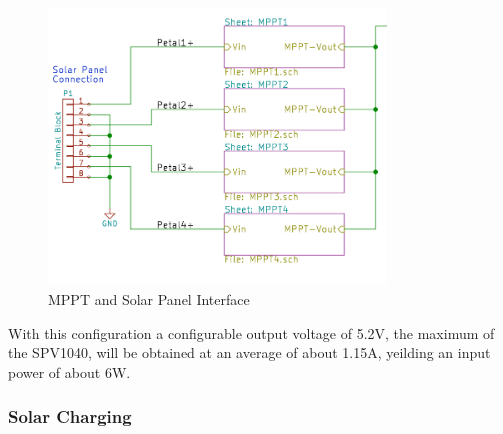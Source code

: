 \documentclass{article}
\numberwithin{figure}{section}
\numberwithin{equation}{section}
\begin{document}
{\begin{figure}[H]
	\centering
	\includegraphics[width=0.8\textwidth]{MPPTblocks}
	\caption{MPPT and Solar Panel Interface}
	\label{fig:mpptsol}
\end{figure}

With this configuration a configurable output voltage of 5.2V, the maximum of the SPV1040, will be obtained at an average of about 1.15A, yeilding an input power of about 6W.

\subsubsection{Solar Charging}


}
\end{document}
